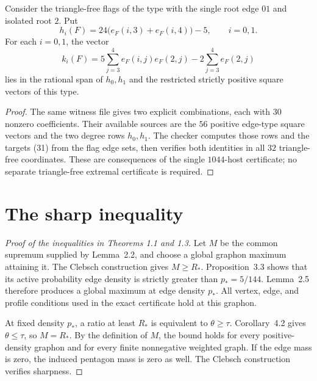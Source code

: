 \begin{lemma}\label{lem:codegree-span}
Consider the triangle-free flags of the type with the single root edge
\(01\) and isolated root \(2\). Put
\[
 h_i(F)=24\bigl(e_F(i,3)+e_F(i,4)\bigr)-5,\qquad i=0,1.
\]
For each \(i=0,1\), the vector
\begin{equation}
 k_i(F)=5\sum_{j=3}^4e_F(i,j)e_F(2,j)
                 -2\sum_{j=3}^4e_F(2,j)\tag{31}
\end{equation}
lies in the rational span of \(h_0,h_1\) and the restricted strictly
positive square vectors of this type.
\end{lemma}
\begin{proof}
The same witness file gives two explicit combinations, each with \(30\)
nonzero coefficients. Their available sources are the \(56\) positive
edge-type square vectors and the two degree rows \(h_0,h_1\). The checker
computes those rows and the targets (31) from the flag edge sets,
then verifies both identities in all \(32\) triangle-free coordinates.
These are consequences of the single \(1044\)-host certificate; no
separate triangle-free extremal certificate is required.
\end{proof}

\section{The sharp inequality}

\begin{proof}[Proof of the inequalities in Theorems 1.1 and 1.3]
Let \(M\) be the common supremum supplied by Lemma~2.2, and choose a
global graphon maximum attaining it. The Clebsch construction gives
\(M\ge R_*\). Proposition~3.3 shows that its active probability edge
density is strictly greater than \(p_*=5/144\). Lemma~2.5 therefore
produces a global maximum at edge density \(p_*\). All vertex, edge, and
profile conditions used in the exact certificate hold at this graphon.

At fixed density \(p_*\), a ratio at least \(R_*\) is equivalent to
\(\theta\ge\tau\). Corollary~4.2 gives \(\theta\le\tau\), so \(M=R_*\).
By the definition of \(M\), the bound holds for every positive-density
graphon and for every finite nonnegative weighted graph. If the edge mass
is zero, the induced pentagon mass is zero as well. The Clebsch
construction verifies sharpness.
\end{proof}
